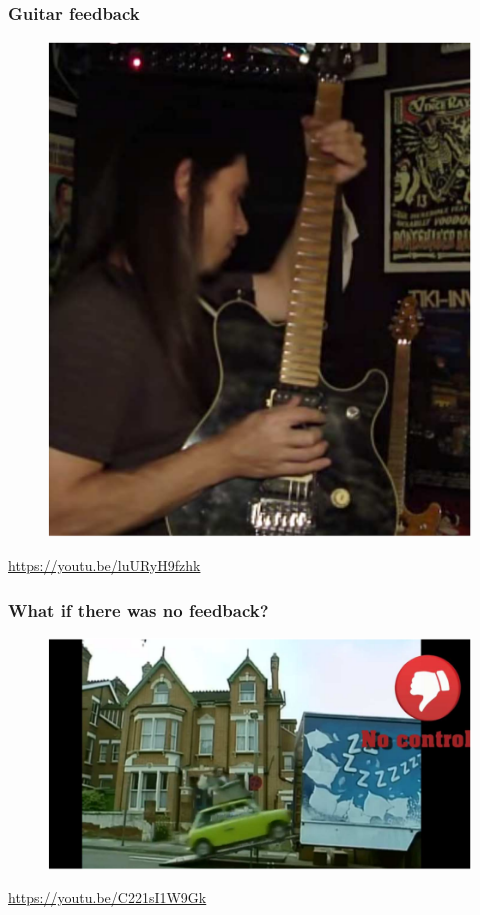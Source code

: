 \documentclass{beamer}
\begin{document}

\begin{frame}
\frametitle{Guitar feedback}
\begin{figure}
\includegraphics[width=.5\linewidth]{guitar}
\end{figure}
\url{https://youtu.be/luURyH9fzhk}
\end{frame}


\begin{frame}
\frametitle{What if there was no feedback?}
\begin{figure}
\includegraphics[width=1\linewidth]{no_feedback}
\end{figure}
\bigskip
\url{https://youtu.be/C221sI1W9Gk}
\end{frame}

\end{document}
